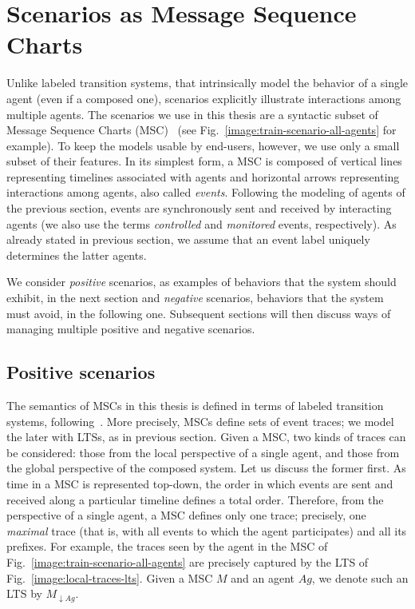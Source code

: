 \section{Scenarios as Message Sequence Charts}

Unlike labeled transition systems, that intrinsically model the behavior of a single agent (even if a composed one), scenarios explicitly illustrate interactions among multiple agents. The scenarios we use in this thesis are a syntactic subset of Message Sequence Charts (MSC)~\cite{ITU:1996} (see Fig.~\ref{image:train-scenario-all-agents} for example). To keep the models usable by end-users, however, we use only a small subset of their features. In its simplest form, a MSC is composed of vertical lines representing timelines associated with agents and horizontal arrows representing interactions among agents, also called \emph{events}. Following the modeling of agents of the previous section, events are synchronously sent and received by interacting agents (we also use the terms \emph{controlled} and \emph{monitored} events, respectively). As already stated in previous section, we assume that an event label uniquely determines the latter agents. 

We consider \emph{positive} scenarios, as examples of behaviors that the system should exhibit, in the next section and \emph{negative} scenarios, behaviors that the system must avoid, in the following one. Subsequent sections will then discuss ways of managing multiple positive and negative scenarios. 

\subsection{Positive scenarios}

The semantics of MSCs in this thesis is defined in terms of labeled transition systems, following~\cite{Uchitel:2003}. More precisely, MSCs define sets of event traces; we model the later with LTSs, as in previous section. Given a MSC, two kinds of traces can be considered: those from the local perspective of a single agent, and those from the global perspective of the composed system. Let us discuss the former first. As time in a MSC is represented top-down, the order in which events are sent and received along a particular timeline defines a total order. Therefore, from the perspective of a single agent, a MSC defines only one trace; precisely, one \emph{maximal} trace (that is, with all events to which the agent participates) and all its prefixes. For example, the traces seen by the  agent in the MSC of Fig.~\ref{image:train-scenario-all-agents} are precisely captured by the LTS of Fig.~\ref{image:local-traces-lts}. Given a MSC $M$ and an agent $Ag$, we denote such an LTS by $M_{\downarrow Ag}$.

